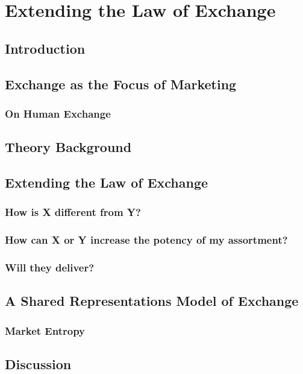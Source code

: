 \chapter{Extending the Law of Exchange\label{law}}

\section{Introduction}
\section{Exchange as the Focus of Marketing}
\subsection{On Human Exchange}
\section{Theory Background}
\section{Extending the Law of Exchange}
\subsection{How is X different from Y?}
\subsection{How can X or Y increase the potency of my assortment?}
\subsection{Will they deliver?}
\section{A Shared Representations Model of Exchange}
\subsection{Market Entropy}
\section{Discussion}


